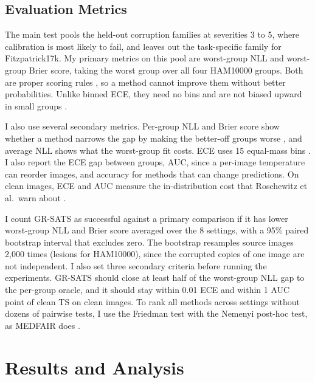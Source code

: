 \documentclass[sigconf,nonacm]{acmart}
\begin{document}
\subsection{Evaluation Metrics}
\label{sec:metrics}

The main test pools the held-out corruption families at severities 3 to 5, where calibration is most likely to fail, and leaves out the task-specific family for Fitzpatrick17k. My primary metrics on this pool are worst-group NLL and worst-group Brier score, taking the worst group over all four HAM10000 groups. Both are proper scoring rules \cite{brier1950verification,gruber2022proper}, so a method cannot improve them without better probabilities. Unlike binned ECE, they need no bins and are not biased upward in small groups \cite{kumar2019verified,roelofs2022mitigating}.

I also use several secondary metrics. Per-group NLL and Brier score show whether a method narrows the gap by making the better-off groups worse \cite{zong2023medfair}, and average NLL shows what the worst-group fit costs. ECE uses 15 equal-mass bins \cite{roelofs2022mitigating}. I also report the ECE gap between groups, AUC, since a per-image temperature can reorder images, and accuracy for methods that can change predictions. On clean images, ECE and AUC measure the in-distribution cost that Roschewitz et al.\ warn about \cite{roschewitz2025where}.

I count GR-SATS as successful against a primary comparison if it has lower worst-group NLL and Brier score averaged over the 8 settings, with a 95\% paired bootstrap interval that excludes zero. The bootstrap resamples source images 2,000 times (lesions for HAM10000), since the corrupted copies of one image are not independent. I also set three secondary criteria before running the experiments. GR-SATS should close at least half of the worst-group NLL gap to the per-group oracle, and it should stay within 0.01 ECE and within 1 AUC point of clean TS on clean images. To rank all methods across settings without dozens of pairwise tests, I use the Friedman test with the Nemenyi post-hoc test, as MEDFAIR does \cite{zong2023medfair}.

\section{Results and Analysis}
\label{sec:results}
\end{document}
